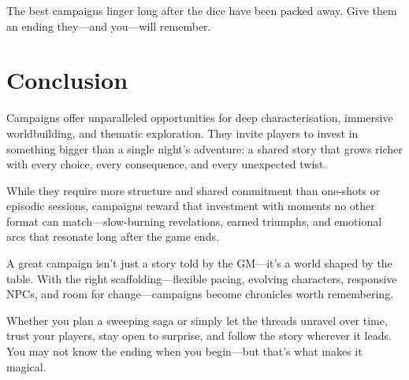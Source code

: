 The best campaigns linger long after the dice have been packed away. Give them an ending they—and you—will remember.




\section{Conclusion}

Campaigns offer unparalleled opportunities for deep characterisation, immersive worldbuilding, and thematic exploration. They invite players to invest in something bigger than a single night’s adventure: a shared story that grows richer with every choice, every consequence, and every unexpected twist.

While they require more structure and shared commitment than one-shots or episodic sessions, campaigns reward that investment with moments no other format can match—slow-burning revelations, earned triumphs, and emotional arcs that resonate long after the game ends.

A great campaign isn’t just a story told by the GM—it’s a world shaped by the table. With the right scaffolding—flexible pacing, evolving characters, responsive NPCs, and room for change—\wyrd campaigns become chronicles worth remembering.

Whether you plan a sweeping saga or simply let the threads unravel over time, trust your players, stay open to surprise, and follow the story wherever it leads. You may not know the ending when you begin—but that’s what makes it magical.

